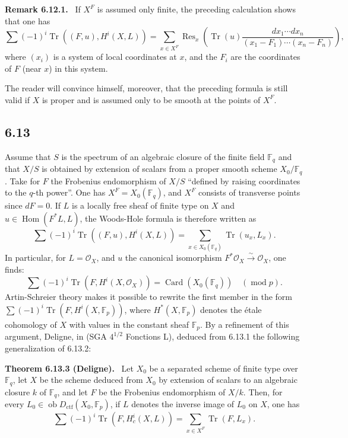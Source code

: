 \documentclass[11pt]{article}
\newenvironment{statement}[1]{\par\medskip\noindent\textbf{#1.}\ }{\par\medskip}
\DeclareMathOperator{\Hom}{Hom}
\newcommand{\ob}{\operatorname{ob}}
\providecommand{\ctf}{\mathrm{ctf}}
\providecommand{\OO}{\mathcal{O}}
\providecommand{\Hom}{\operatorname{Hom}}
\providecommand{\ob}{\operatorname{ob}}
\providecommand{\Hom}{\operatorname{Hom}}
\begin{document}
\begin{statement}{Remark 6.12.1}
If $X^F$ is assumed only finite, the preceding calculation shows that one has
\[
\sum(-1)^i\operatorname{Tr}((F,u),H^i(X,L))=
\sum_{x\in X^F}\operatorname{Res}_x\left(\operatorname{Tr}(u)\frac{dx_1\cdots dx_n}{(x_1-F_1)\cdots(x_n-F_n)}\right),
\]
where $(x_i)$ is a system of local coordinates at $x$, and the $F_i$ are the coordinates of $F$ (near $x$) in this system.

The reader will convince himself, moreover, that the preceding formula is still valid if $X$ is proper and is assumed only to be smooth at the points of $X^F$.
\end{statement}

\subsection*{6.13}
Assume that $S$ is the spectrum of an algebraic closure of the finite field $\mathbb F_q$ and that $X/S$ is obtained by extension of scalars from a proper smooth scheme $X_0/\mathbb F_q$. Take for $F$ the Frobenius endomorphism of $X/S$ ``defined by raising coordinates to the $q$-th power''. One has $X^F=X_0(\mathbb F_q)$, and $X^F$ consists of transverse points since $dF=0$. If $L$ is a locally free sheaf of finite type on $X$ and $u\in\Hom(F^*L,L)$, the Woods-Hole formula is therefore written as
\begin{equation}
\tag{6.13.1}
\sum(-1)^i\operatorname{Tr}((F,u),H^i(X,L))=
\sum_{x\in X_0(\mathbb F_q)}\operatorname{Tr}(u_x,L_x).
\end{equation}
In particular, for $L=\OO_X$, and $u$ the canonical isomorphism $F^*\OO_X\xrightarrow{\sim}\OO_X$, one finds:
\begin{equation}
\tag{6.13.2}
\sum(-1)^i\operatorname{Tr}(F,H^i(X,\OO_X))=\operatorname{Card}(X_0(\mathbb F_q))\quad(\operatorname{mod} p).
\end{equation}
Artin-Schreier theory makes it possible to rewrite the first member in the form $\sum(-1)^i\operatorname{Tr}(F,H^i(X,\mathbb F_p))$, where $H^*(X,\mathbb F_p)$ denotes the étale cohomology of $X$ with values in the constant sheaf $\mathbb F_p$. By a refinement of this argument, Deligne, in (SGA $4^{1/2}$ Fonctions L), deduced from 6.13.1 the following generalization of 6.13.2:


\begin{statement}{Theorem 6.13.3 (Deligne)}
Let $X_0$ be a separated scheme of finite type over $\mathbb F_q$, let $X$ be the scheme deduced from $X_0$ by extension of scalars to an algebraic closure $k$ of $\mathbb F_q$, and let $F$ be the Frobenius endomorphism of $X/k$. Then, for every $L_0\in\ob D_{\ctf}(X_0,\mathbb F_p)$, if $L$ denotes the inverse image of $L_0$ on $X$, one has
\[
\sum(-1)^i\operatorname{Tr}(F,H_c^i(X,L))=
\sum_{x\in X^F}\operatorname{Tr}(F,L_x).
\]
\end{statement}
\end{document}

